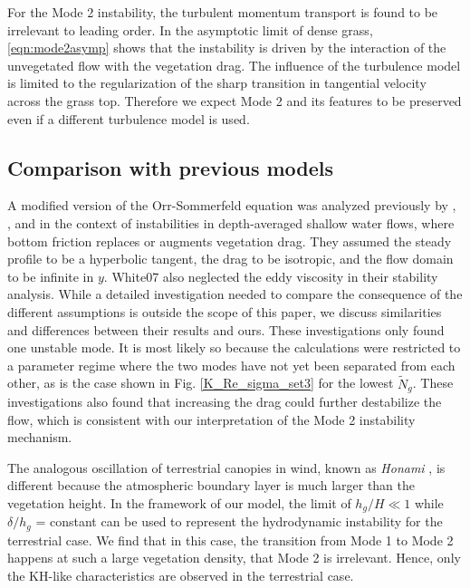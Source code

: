 \documentclass[12pt]{report}   %
\newcommand{\hg}{h_g}
\newcommand{\Ndg}{\tilde{N}_g}
\begin{document}
For the Mode 2 instability, the turbulent momentum transport is found to be irrelevant to leading order.
In the asymptotic limit of dense grass, \eqref{eqn:mode2asymp} shows that the instability is driven by the interaction of the unvegetated flow with the vegetation drag.
The influence of the turbulence model is limited to the regularization of the sharp transition in tangential velocity across the grass top.
Therefore we expect Mode 2 and its features to be preserved even if a different turbulence model is used.
\subsection{Comparison with previous models}

A modified version of the Orr-Sommerfeld equation was analyzed previously by \cite{Chu91}, \cite{Chen97}, and \cite{White07} in the context of instabilities in depth-averaged shallow water flows, where bottom friction replaces or augments vegetation drag.
They assumed the steady profile to be a hyperbolic tangent, the drag to be isotropic, and the flow domain to be infinite in $y$.
{White07} also neglected the eddy viscosity in their stability analysis.
While a detailed investigation needed to compare the consequence of the different assumptions is outside the scope of this paper, we discuss similarities and differences between their results and ours.
These investigations only found one unstable mode.
It is most likely so because the calculations were restricted to a parameter regime where the two modes have not yet been separated from each other, as is the case shown in Fig. \ref{K_Re_sigma_set3} for the lowest $\Ndg$.
These investigations also found that increasing the drag could further destabilize the flow, which is consistent with our interpretation of the Mode 2 instability mechanism.

The analogous oscillation of terrestrial canopies in wind, known as \textit{Honami} \cite{Inoue56,Raupach96}, is different because the atmospheric boundary layer is much larger than the vegetation height.
In the framework of our model, the limit of $\hg/H \ll 1$ while $\delta/\hg$ = constant can be used to represent the hydrodynamic instability for the terrestrial case.
We find that in this case, the transition from Mode 1 to Mode 2 happens at such a large vegetation density, that Mode 2 is irrelevant. 
Hence, only the KH-like characteristics are observed in the terrestrial case. 
\end{document}
